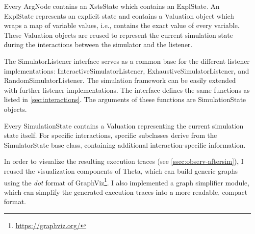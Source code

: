 Every \textsf{ArgNode} contains an \textsf{XstsState} which contains an \textsf{ExplState}. An \textsf{ExplState} represents an explicit state and contains a \textsf{Valuation} object which wraps a map of variable values, i.e., contains the exact value of every variable. These \textsf{Valuation} objects are reused to represent the current simulation state during the interactions between the simulator and the listener.

The \textsf{SimulatorListener} interface serves as a common base for the different listener implementations: \textsf{InteractiveSimulatorListener}, \textsf{ExhaustiveSimulatorListener}, and \textsf{RandomSimulatorListener}. The simulation framework can be easily extended with further listener implementations. The interface defines the same functions as listed in \autoref{sec:interactions}. The arguments of these functions are \textsf{SimulationState} objects.

Every \textsf{SimulationState} contains a \textsf{Valuation} representing the current simulation state itself. For specific interactions, specific subclasses derive from the \textsf{SimulatorState} base class, containing additional interaction-specific information.

In order to visualize the resulting execution traces (see \autoref{ssec:observ-aftersim}), I reused the visualization components of Theta, which can build generic graphs using the \emph{dot} format of GraphViz\footnote{\url{https://graphviz.org/}}. I also implemented a graph simplifier module, which can simplify the generated execution traces into a more readable, compact format.
